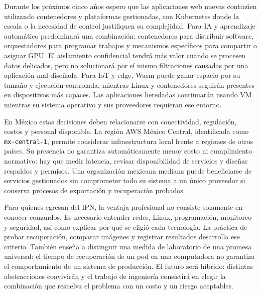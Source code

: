 Durante los próximos cinco años espero que las aplicaciones web nuevas continúen utilizando contenedores y plataformas gestionadas, con Kubernetes donde la escala o la necesidad de control justifiquen su complejidad. Para IA y aprendizaje automático predominará una combinación: contenedores para distribuir software, orquestadores para programar trabajos y mecanismos específicos para compartir o asignar GPU. El aislamiento confidencial tendrá más valor cuando se procesen datos delicados, pero no solucionará por sí mismo filtraciones causadas por una aplicación mal diseñada. Para IoT y edge, Wasm puede ganar espacio por su tamaño y ejecución controlada, mientras Linux y contenedores seguirán presentes en dispositivos más capaces. Las aplicaciones heredadas continuarán usando VM mientras su sistema operativo y sus proveedores requieran ese entorno.

En México estas decisiones deben relacionarse con conectividad, regulación, costos y personal disponible. La región AWS México Central, identificada como \texttt{mx-central-1}, permite considerar infraestructura local frente a regiones de otros países. Su presencia no garantiza automáticamente menor costo ni cumplimiento normativo: hay que medir latencia, revisar disponibilidad de servicios y diseñar respaldos y permisos. Una organización mexicana mediana puede beneficiarse de servicios gestionados sin comprometer todo su sistema a un único proveedor si conserva procesos de exportación y recuperación probados.

Para quienes egresan del IPN, la ventaja profesional no consiste solamente en conocer comandos. Es necesario entender redes, Linux, programación, monitoreo y seguridad, así como explicar por qué se eligió cada tecnología. La práctica de probar recuperación, comparar imágenes y registrar resultados desarrolla ese criterio. También enseña a distinguir una medida de laboratorio de una promesa universal: el tiempo de recuperación de un pod en una computadora no garantiza el comportamiento de un sistema de producción. El futuro será híbrido: distintas abstracciones convivirán y el trabajo de ingeniería consistirá en elegir la combinación que resuelva el problema con un costo y un riesgo aceptables.


